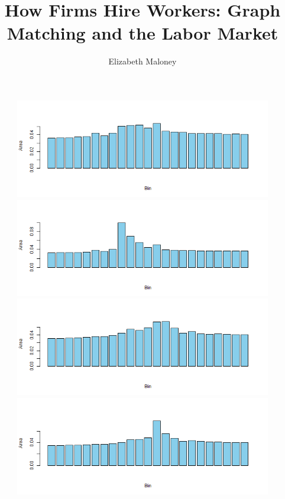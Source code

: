 \documentclass[11pt]{article}
\theoremstyle{plain}
\theoremstyle{definition}
\begin{document}
 

\title{How Firms Hire Workers: Graph Matching and the Labor Market}
\author{Elizabeth Maloney}
\begin{figure}[H]
\begin{center}
\includegraphics[trim ={3.5cm 2.7cm 2cm 2cm},scale=.6, clip=true]{Binned_Areas1.png}
\includegraphics[trim ={3.5cm 2.7cm 2cm 2cm},scale=.6, clip=true]{Binned_Areas2.png}
\includegraphics[trim ={3.5cm 2.7cm 2cm 2cm},scale=.6, clip=true]{Binned_Areas3.png}
\includegraphics[trim ={3.5cm 2.7cm 2cm 2cm},scale=.6, clip=true]{Binned_Areas4.png}

\end{center}
\end{figure}
\end{document}
